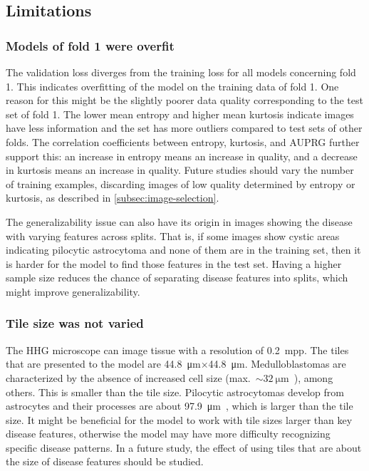 \subsection{Limitations}
\subsubsection{Models of fold 1 were overfit}
The validation loss diverges from the training loss for all models concerning fold 1.
This indicates overfitting of the model on the training data of fold 1.
One reason for this might be the slightly poorer data quality corresponding to the test set of fold 1.
The lower mean entropy and higher mean kurtosis indicate images have less information and the set has more outliers compared to test sets of other folds.
The correlation coefficients between entropy, kurtosis, and AUPRG further support this: an increase in entropy means an increase in quality, and a decrease in kurtosis means an increase in quality.
Future studies should vary the number of training examples, discarding images of low quality determined by entropy or kurtosis, as described in \ref{subsec:image-selection}.

The generalizability issue can also have its origin in images showing the disease with varying features across splits.
That is, if some images show \eg cystic areas indicating pilocytic astrocytoma and none of them are in the training set, then it is harder for the model to find those features in the test set.
Having a higher sample size reduces the chance of separating disease features into splits, which might improve generalizability.

\subsubsection{Tile size was not varied}
The HHG microscope can image tissue with a resolution of \qty{0.2}{mpp}.
The tiles that are presented to the model are \qty{44.8}{\micro\meter}$\times$\qty{44.8}{\micro\meter}.
Medulloblastomas are characterized by the absence of increased cell size (max.~$\sim$$\qty{32}{\micro\meter}$~), among others.
This is smaller than the tile size.
Pilocytic astrocytomas develop from astrocytes and their processes are about \qty{97.9}{\micro\meter}~, which is larger than the tile size.
It might be beneficial for the model to work with tile sizes larger than key disease features, otherwise the model may have more difficulty recognizing specific disease patterns.
In a future study, the effect of using tiles that are about the size of disease features should be studied.

